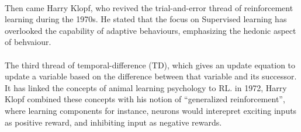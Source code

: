 \documentclass{article}
\begin{document}
    \paragraph{}Then came Harry Klopf, who revived the trial-and-error thread of reinforcement learning during the 1970s. He stated that the focus on Supervised learning has overlooked the capability of adaptive behaviours, emphasizing the hedonic aspect of behvaiour. 
    \paragraph{}The third thread of temporal-difference (TD), which gives an update equation to update a variable based on the difference between that variable and its successor. It has linked the concepts of animal learning psychology to RL. in 1972, Harry Klopf combined these concepts with his notion of “generalized reinforcement”, where learning components for instance, neurons would interepret exciting inputs as positive reward, and inhibiting input as negative rewards.
  \fi
\end{document}

